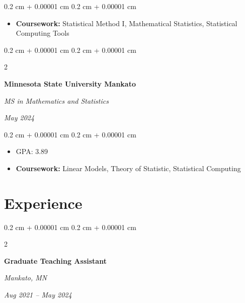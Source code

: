 \documentclass[10pt, letterpaper]{article}
\newenvironment{highlights}{
    \begin{itemize}[
        topsep=0.10 cm,
        parsep=0.10 cm,
        partopsep=0pt,
        itemsep=0pt,
        leftmargin=0.4 cm + 10pt
    ]
}{
    \end{itemize}
} %
\newenvironment{onecolentry}{
    \begin{adjustwidth}{
        0.2 cm + 0.00001 cm
    }{
        0.2 cm + 0.00001 cm
    }
}{
    \end{adjustwidth}
} %
\newenvironment{twocolentry}[2][]{
    \onecolentry
    \def\secondColumn{#2}
    \setcolumnwidth{\fill, 4.5 cm}
    \begin{paracol}{2}
}{
    \switchcolumn \raggedleft \secondColumn
    \end{paracol}
    \endonecolentry
} %
\begin{document}
\vspace{0.10 cm}
        \begin{onecolentry}
            \begin{highlights} 
                \item \textbf{Coursework:} Statistical Method I, Mathematical Statistics, Statistical Computing Tools 
            \end{highlights}
        \end{onecolentry}

\vspace{0.30 cm}
        
        \begin{twocolentry}{
            
            
        \textit{May 2024}}
            \textbf{Minnesota State University Mankato}

            \textit{MS in Mathematics and Statistics}
        \end{twocolentry}

        \vspace{0.10 cm}
        \begin{onecolentry}
            \begin{highlights}
                \item GPA: 3.89 
                \item \textbf{Coursework:} Linear Models, Theory of Statistic, Statistical Computing 
            \end{highlights}
        \end{onecolentry}



    
    \section{Experience}



        
        \begin{twocolentry}{
        \textit{Mankato, MN}    
            
        \textit{Aug 2021 – May 2024}}
            \textbf{Graduate Teaching Assistant}
            

        \end{twocolentry}
\end{document}
